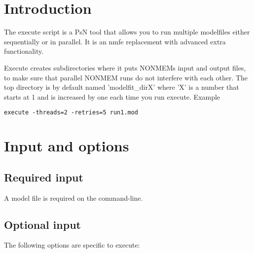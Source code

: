 




\maketitle
\newcommand{\guidetoolname}{execute}


\section{Introduction}
The execute script is a PsN tool that allows you to run multiple modelfiles either sequentially or in parallel. It is an nmfe replacement with advanced extra
functionality.

Execute creates subdirectories where it puts NONMEMs input and output files, to make sure that parallel NONMEM runs do not interfere with each other.
The top directory is by default named 'modelfit\_dirX' where 'X' is a number that starts at 1 and is increased by one each time you run execute.
Example
\begin{verbatim}
execute -threads=2 -retries=5 run1.mod 
\end{verbatim}


\section{Input and options}
\subsection{Required input}
A model file is required on the command-line. 

\subsection{Optional input}
The following options are specific to execute:

